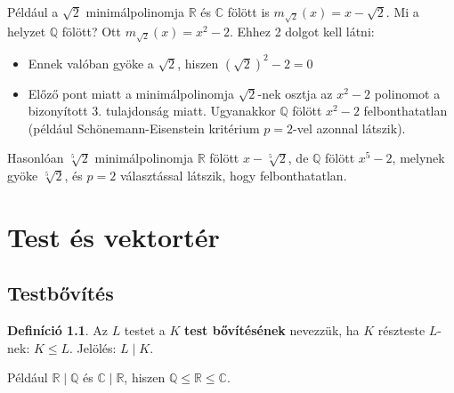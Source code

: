 \documentclass[12pt]{book}
\theoremstyle{plain} %
\theoremstyle{definition} %
\newtheorem{defi/}{Definíció}[section]
\newenvironment{defi}
  {\renewcommand{\qedsymbol}{$\clubsuit$}%
   \pushQED{\qed}\begin{defi/}}
  {\popQED\end{defi/}}
\theoremstyle{remark}
\renewcommand\qedsymbol{$\blacksquare$}
\numberwithin{equation}{section}  %
\begin{document}
	Például a $\sqrt{2}$ minimálpolinomja $\mathbb{R}$ és $\mathbb{C}$ fölött is $m_{\sqrt{2}}(x)=x-\sqrt{2}$. Mi a helyzet $\mathbb{Q}$ fölött? Ott $m_{\sqrt{2}}(x)=x^2-2$. Ehhez 2 dolgot kell látni:
	\begin{itemize}
		\item Ennek valóban gyöke a $\sqrt{2}$, hiszen $(\sqrt{2})^2 -2 = 0$
		\item Előző pont miatt a minimálpolinomja $\sqrt{2}$-nek osztja az $x^2-2$ polinomot a bizonyított 3. tulajdonság miatt. Ugyanakkor $\mathbb{Q}$ fölött $x^2-2$ felbonthatatlan (például Schönemann-Eisenstein kritérium $p=2$-vel azonnal látszik).
	\end{itemize}
	
	Hasonlóan $\sqrt[5]{2}$ minimálpolinomja $\mathbb{R}$ fölött $x-\sqrt[5]{2}$, de $\mathbb{Q}$ fölött $x^5-2$, melynek gyöke $\sqrt[5]{2}$, és $p=2$ választással látszik, hogy felbonthatatlan.
	
	
	\chapter{Test és vektortér}
	\section{Testbővítés}
	
	\begin{defi}
		Az $L$ testet a $K$ \textbf{test bővítésének} nevezzük, ha $K$ részteste $L$-nek: $K\leq L$. Jelölés: $L\mid K$.
	\end{defi}

	Például $\mathbb{R}\mid \mathbb{Q}$ és $\mathbb{C} \mid \mathbb{R}$, hiszen $\mathbb{Q}\leq \mathbb{R} \leq \mathbb{C}$.
	
\end{document}
